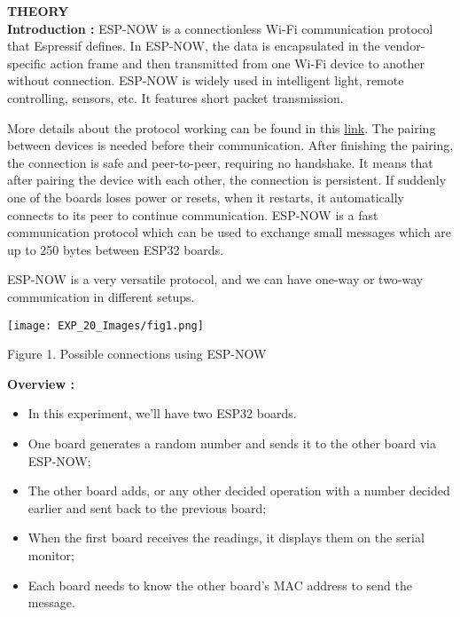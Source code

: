 \documentclass[12pt,a4paper]{article}
\begin{document}
\begin{justify}
\textbf{\large THEORY}\\[3pt]
\textbf{Introduction :} ESP-NOW is a connectionless Wi-Fi communication protocol that Espressif defines. In ESP-NOW, the data is encapsulated in the vendor-specific action frame and then transmitted from one Wi-Fi device to another without connection. ESP-NOW is widely used in intelligent light, remote controlling, sensors, etc. It features short packet transmission.\par
\noindent More details about the protocol working can be found in this \href{https://docs.espressif.com/projects/esp-idf/en/latest/esp32/api-reference/network/esp_now.html}{link}. The pairing between devices is needed before their communication. After finishing the pairing, the connection is safe and peer-to-peer, requiring no handshake. It means that after pairing the device with each other, the connection is persistent. If suddenly one of the boards loses power or resets, when it restarts, it automatically connects to its peer to continue communication. ESP-NOW is a fast communication protocol which can be used to exchange small messages which are up to 250 bytes between ESP32 boards.\par
\noindent ESP-NOW is a very versatile protocol, and we can have one-way or two-way communication in different setups.


\begin{center} 
\texttt{[image: EXP\_20\_Images/fig1.png]}
\end{center}
\begin{center} {Figure 1. Possible connections using ESP-NOW}\end{center}

\textbf{Overview :}
\vspace{-3mm}
\begin{itemize}
\setlength\itemsep{-0.3em}
\item In this experiment, we'll have two ESP32 boards. 
\item  One board generates a random number and sends it to the other board via ESP-NOW;
\item  The other board adds, or any other decided operation with a number decided earlier and sent back to the previous board;
\item  When the first board receives the readings, it displays them on the serial monitor;
\item  Each board needs to know the other board's MAC address to send the message.
\end{itemize}
\end{justify}
\end{document}
